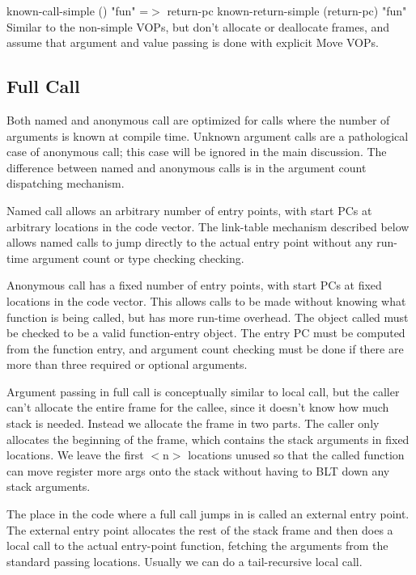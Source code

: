 {\begin{itemize, spread 0, spacing 1}
known-call-simple () "fun" =$>$ return-pc
known-return-simple (return-pc) "fun"
    Similar to the non-simple VOPs, but don't allocate or deallocate frames,
    and assume that argument and value passing is done with explicit Move VOPs.


\subsection{Full Call}

Both named and anonymous call are optimized for calls where the number of
arguments is known at compile time.  Unknown argument calls are a
pathological case of anonymous call; this case will be ignored in the main
discussion.  The difference between named and anonymous calls is in the
argument count dispatching mechanism.

Named call allows an arbitrary number of entry points, with start PCs at
arbitrary locations in the code vector.  The link-table mechanism described
below allows named calls to jump directly to the actual entry point without any
run-time argument count or type checking checking.

Anonymous call has a fixed number of entry points, with start PCs at fixed
locations in the code vector.  This allows calls to be made without knowing
what function is being called, but has more run-time overhead.  The object
called must be checked to be a valid function-entry object.  The entry PC must
be computed from the function entry, and argument count checking must be done
if there are more than three required or optional arguments.

Argument passing in full call is conceptually similar to local call, but the
caller can't allocate the entire frame for the callee, since it doesn't know
how much stack is needed.  Instead we allocate the frame in two parts.  The
caller only allocates the beginning of the frame, which contains the stack
arguments in fixed locations.  We leave the first $<$n$>$ locations unused so that
the called function can move register more args onto the stack without having
to BLT down any stack arguments.

The place in the code where a full call jumps in is called an external entry
point.  The external entry point allocates the rest of the stack frame and then
does a local call to the actual entry-point function, fetching the arguments
from the standard passing locations.  Usually we can do a tail-recursive local
call.  


\end{itemize, spread 0, spacing 1}}
